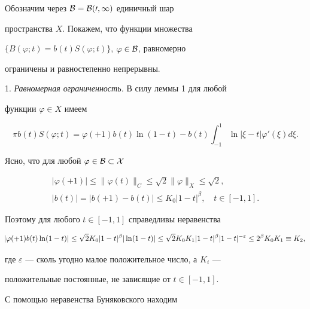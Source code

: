 \begin{pf}


Обозначим через $\cal B=\cal B(0,1)$ единичный шар


пространства $X$. Покажем, что функции множества 


$\{B(\varphi;t)=b(t)S(\varphi;t)\}$, $\varphi\in \cal B$, равномерно 


ограничены и равностепенно непрерывны.





1. {\it Равномерная ограниченность.} В силу леммы 1 для любой


функции $\varphi\in X$ имеем


\begin{equation}


\pi b(t)S(\varphi;t)=\varphi(+1)b(t)\ln(1-t)-b(t)\int_{-1}^1\ln|\xi-t|


\varphi'(\xi)d\xi.


\end{equation}


Ясно, что для любой $\varphi\in \cal B\subset X$


\begin{gather*}


|\varphi(+1)|\leq\|\varphi(t)\|_C\leq\sqrt{2}\|\varphi


\|_X\leq\sqrt{2},\\


%


| b(t)|=| b(+1)-b(t)|\leq K_0| 1-t|^\beta,\quad t\in[-1,1].


\end{gather*}


Поэтому для любого $t\in[-1,1]$ справедливы неравенства


\begin{equation}


\negthickspace |\varphi(+1)b(t)\ln(1-t)|\leq\sqrt{2}K_0| 1-t|^\beta


|\ln(1-t)|\leq\sqrt{2}K_0K_1| 1-t|^\beta| 1-t|^


{-\varepsilon}\leq 2^{\beta}K_0K_1\equiv K_2,


\end{equation}


где $\varepsilon$ --- сколь угодно малое положительное число, а $K_i$ ---


положительные постоянные, не зависящие от $t\in[-1,1]$.


С помощью неравенства Буняковского находим



\end{pf}
